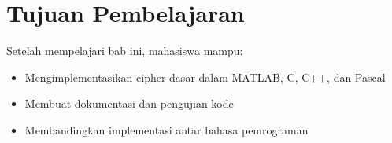 \section*{Tujuan Pembelajaran}
Setelah mempelajari bab ini, mahasiswa mampu:
\begin{itemize}
\item Mengimplementasikan cipher dasar dalam MATLAB, C, C++, dan Pascal
\item Membuat dokumentasi dan pengujian kode
\item Membandingkan implementasi antar bahasa pemrograman
\end{itemize}
